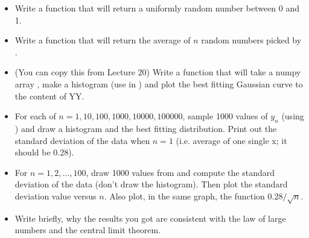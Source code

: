 \documentclass[letterpaper,11pt]{amsart}
\theoremstyle{plain}
\theoremstyle{definition}
\begin{document}
\begin{itemize}
  \item Write a function  that will return a uniformly random number between 0 and 1. 
  \item Write a function  that will return the average of $n$ random numbers picked by . 
  \item (You can copy this from Lecture 20) Write a function  that will take a numpy array , make a histogram (use  in ) and plot the best fitting Gaussian curve to the content of YY. 
  \item For each of $n=1,10,100,1000,10000,100000$, sample 1000 values of $y_n$ (using ) and draw a histogram and the best fitting distribution. Print out the standard deviation of the data when $n=1$ (i.e. average of one single x; it should be 0.28). 
  \item For $n=1,2,\dots,100$, draw 1000 values from  and compute the standard deviation of the data (don't draw the histogram). Then plot the standard deviation value versus $n$. Also plot, in the same graph, the function $0.28 / \sqrt{n}$.
  \item Write briefly, why the results you got are consistent with the law of large numbers and the central limit theorem. 
\end{itemize}
\end{document}
